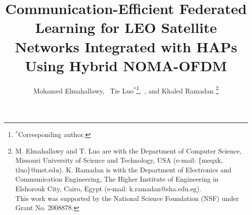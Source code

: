 \documentclass[letter,journal]{IEEEtran}
\begin{document}
\title{{Communication-Efficient Federated Learning for LEO Satellite Networks Integrated with HAPs Using Hybrid NOMA-OFDM}}
  \author{Mohamed Elmahallawy,~
      Tie Luo$^*$\thanks{$^*$Corresponding author.},~, and Khaled Ramadan
\thanks{M. Elmahallawy and T. Luo are with the Department of Computer Science, Missouri University of Science and Technology, USA (e-mail: \{meqxk, tluo\}@mst.edu). K. Ramadan is with the Department of Electronics and  Communication Engineering, The Higher Institute of Engineering in Elshorouk City, Cairo, Egypt (e-mail: k.ramadan@sha.edu.eg).\\
\indent This work was supported by the National Science Foundation (NSF) under Grant No. 2008878.} }


\end{document}
